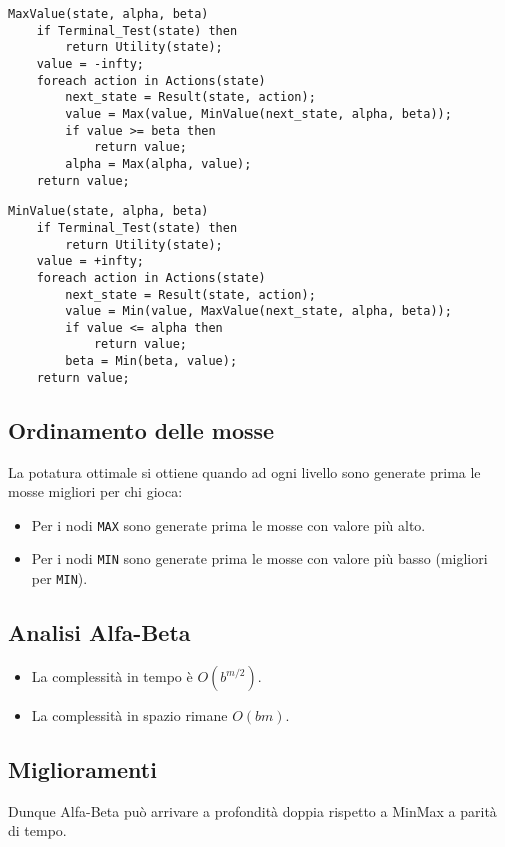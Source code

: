 \begin{lstlisting}[style=pseudo-style]
MaxValue(state, alpha, beta)
	if Terminal_Test(state) then
		return Utility(state);
	value = -infty;
	foreach action in Actions(state)
		next_state = Result(state, action);
		value = Max(value, MinValue(next_state, alpha, beta));
		if value >= beta then
			return value;
		alpha = Max(alpha, value);
	return value;
\end{lstlisting}

\begin{lstlisting}[style=pseudo-style]
MinValue(state, alpha, beta)
	if Terminal_Test(state) then
		return Utility(state);
	value = +infty;
	foreach action in Actions(state)
		next_state = Result(state, action);
		value = Min(value, MaxValue(next_state, alpha, beta));
		if value <= alpha then
			return value;
		beta = Min(beta, value);
	return value;
\end{lstlisting}

\subsection{Ordinamento delle mosse}
La potatura ottimale si ottiene quando ad ogni livello sono generate prima le mosse migliori per chi gioca:
\begin{itemize}
	\item Per i nodi \verb|MAX| sono generate prima le mosse con valore pi\`u alto.
	\item Per i nodi \verb|MIN| sono generate prima le mosse con valore pi\`u basso (migliori per \verb|MIN|).
\end{itemize}

\subsection{Analisi Alfa-Beta}
\begin{itemize}
	\item La complessit\`a in tempo \`e $O(b^{m/2})$.
	\item La complessit\`a in spazio rimane $O(bm)$.
\end{itemize}

\subsection{Miglioramenti}
Dunque Alfa-Beta pu\`o arrivare a profondit\`a doppia rispetto a MinMax a parit\`a di tempo.

